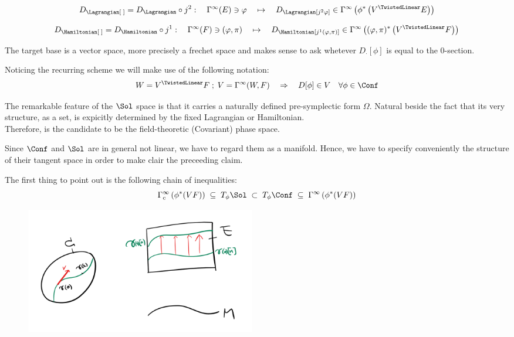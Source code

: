 \documentclass[a4paper,12pt]{scrartcl}  %
\begin{document}
\begin{equation}
	D_\Lagrangian[\; ] = D_\Lagrangian \circ j^2 : \quad \Gamma^\infty(E) \ni \varphi \quad \mapsto \quad D_\Lagrangian[j^2 \varphi ] \in \Gamma^\infty \left( \phi^\ast \left(V^\TwistedLinear E \right)\right)
\end{equation}

\begin{equation}
	D_\Hamiltonian[\; ] = D_\Hamiltonian \circ j^1 : \quad \Gamma^\infty(F) \ni (\varphi,\pi) \quad \mapsto \quad D_\Hamiltonian[j^1 (\varphi,\pi) ] \in \Gamma^\infty \left( (\varphi,\pi)^\ast \left(V^\TwistedLinear F \right)\right)
\end{equation}

The target base is a vector space, more precisely a frechet space \cite[Cap.2]{Ban} and makes sense to ask whetever $D_\cdot [\phi]$ is equal to the 0-section.

\begin{notationfix}
Noticing the recurring scheme we will make use of the following notation:
	\begin{displaymath}
		W = V^\TwistedLinear F \; ; \; V = \Gamma^\infty(W,F) \quad \Rightarrow \quad D[\phi] \in V \quad \forall \phi \in \Conf
	\end{displaymath}
\end{notationfix}

The remarkable feature of the $\Sol$ space is that it carries a naturally defined pre-symplectic form $\Omega$. Natural beside the fact that its very structure, as a set, is expicitly determined by the fixed Lagrangian or Hamiltonian.\\
Therefore, is the candidate to  be the field-theoretic (Covariant) phase space.

Since $\Conf$ and $\Sol$ are in general not linear, we have to regard them as a manifold.
Hence, we have to specify conveniently the structure of their tangent space in order to make clair the preceeding claim.

The first thing to point out is the following chain of inequalities:
\begin{equation}
	\Gamma^\infty_c\left(\phi^*(VF)\right) \; \subseteq \; T_\phi\Sol \; \subset \; T_\phi\Conf \; \subseteq \; \Gamma^\infty\left( \phi^\ast (VF) \right)
\end{equation}

\begin{figure}
\centering
\includegraphics[width=0.49\textwidth]{Pictures/variations.png}
\end{figure}
\end{document}

